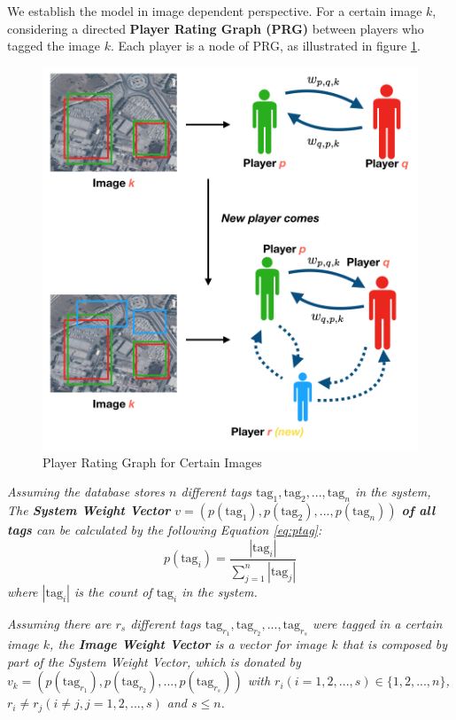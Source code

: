 We establish the model in image dependent perspective. For a certain image $k$,
considering a directed \textbf{Player Rating Graph (PRG)\label{idx:prg}} 
between players who tagged the image $k$. Each player is a node of PRG, 
as illustrated in figure \ref{fig:graph}. 

\begin{figure}[htp]
\centering
\includegraphics[width=0.5\columnwidth]{figures/graph2}
\caption{Player Rating Graph for Certain Images}
\label{fig:graph}
\end{figure}

\begin{definition}
\label{def:weightv}
\emph{
Assuming the database stores $n$ different tags $\text{tag}_1, \text{tag}_2, ..., \text{tag}_n$ in the system,
The \textbf{System Weight Vector} $v = (p(\text{tag}_1), p(\text{tag}_2), ..., p(\text{tag}_n))$ 
\textbf{of all tags} can be calculated by the following Equation \ref{eq:ptag}:
\begin{equation}
\label{eq:ptag}
p(\text{tag}_i) = \frac{|\text{tag}_i|}{\sum_{j=1}^{n}{|\text{tag}_j|}}
\end{equation}
where  $|\text{tag}_i|$ is the count of $\text{tag}_i$ in the system.
}
\end{definition}
\begin{definition}
\label{def:weightvk}
\emph{
Assuming there are $r_s$ different tags $\text{tag}_{r_1}, \text{tag}_{r_2}, ..., \text{tag}_{r_s}$ were tagged in
a certain image $k$, the \textbf{Image Weight Vector} is a vector for image $k$ that is
composed by part of the System Weight Vector, which 
is donated by $v_k = (p(\text{tag}_{r_1}), p(\text{tag}_{r_2}), ..., p(\text{tag}_{r_s}))$
with $r_i (i=1,2,...,s) \in \{1, 2, ..., n\}$, $r_i \neq r_j (i\neq j, j=1,2,...,s)$ and $s \leq n$.
}
\end{definition}


